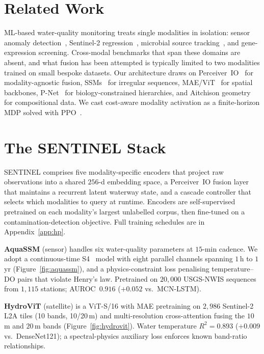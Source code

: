 \documentclass{article}
\begin{document}
\section{Related Work}
\label{sec:related}

ML-based water-quality monitoring treats single modalities in isolation: sensor anomaly detection~\citep{olden2008ml_ecology, guidotti2024watermlsurvey}, Sentinel-2 regression~\citep{drusch2012sentinel2}, microbial source tracking~\citep{thompson2017earthmicrobiome}, and gene-expression screening. Cross-modal benchmarks that span these domains are absent, and what fusion has been attempted is typically limited to two modalities trained on small bespoke datasets. Our architecture draws on Perceiver~IO~\citep{jaegle2022perceiverio} for modality-agnostic fusion, SSMs~\citep{gu2022s4, gu2024mamba} for irregular sequences, MAE/ViT~\citep{he2022mae, dosovitskiy2021vit} for spatial backbones, P-Net~\citep{elmarakeby2021pnet} for biology-constrained hierarchies, and Aitchison geometry~\citep{aitchison1982} for compositional data. We cast cost-aware modality activation as a finite-horizon MDP solved with PPO~\citep{schulman2017ppo}.

\section{The SENTINEL Stack}
\label{sec:method}

SENTINEL comprises five modality-specific encoders that project raw observations into a shared $256$-d embedding space, a Perceiver~IO fusion layer that maintains a recurrent latent waterway state, and a cascade controller that selects which modalities to query at runtime. Encoders are self-supervised pretrained on each modality's largest unlabelled corpus, then fine-tuned on a contamination-detection objective. Full training schedules are in Appendix~\ref{app:hp}.

\textbf{AquaSSM} (sensor) handles six water-quality parameters at $15$-min cadence. We adopt a continuous-time S4~\citep{gu2022s4} model with eight parallel channels spanning $1$\,h to $1$\,yr (Figure~\ref{fig:aquassm}), and a physics-constraint loss penalising temperature--DO pairs that violate Henry's law. Pretrained on $20{,}000$ USGS-NWIS sequences from $1{,}115$ stations; AUROC~$0.916$ ($+0.052$ vs.\ MCN-LSTM).

\textbf{HydroViT} (satellite) is a ViT-S/16 with MAE pretraining on $2{,}986$ Sentinel-2 L2A tiles (10 bands, 10/20\,m) and multi-resolution cross-attention fusing the $10$\,m and $20$\,m bands (Figure~\ref{fig:hydrovit}). Water temperature $R^2\!=\!0.893$ ($+0.009$ vs.\ DenseNet121); a spectral-physics auxiliary loss enforces known band-ratio relationships.
\end{document}
